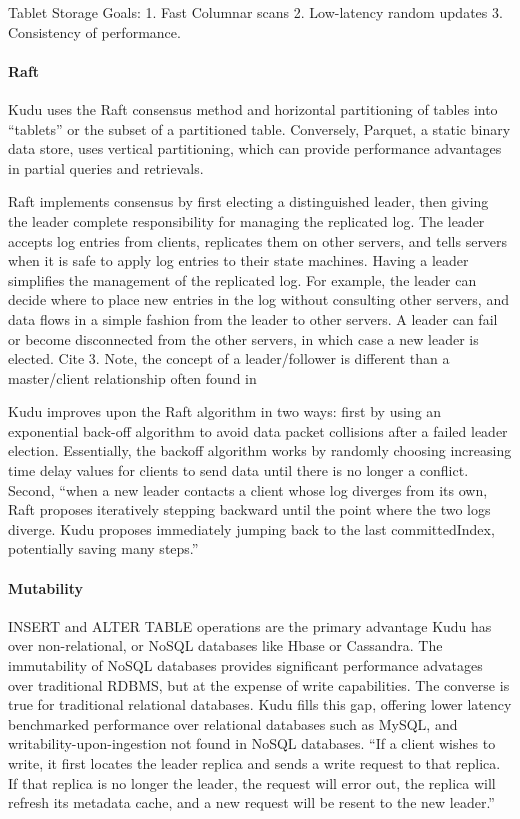 \begin{enumerate}
Tablet Storage Goals: 
1. Fast Columnar scans
2. Low-latency random updates
3. Consistency of performance.
\end{enumerate}

\paragraph{Raft}
Kudu uses the Raft consensus method and horizontal partitioning of
tables into ``tablets'' or the subset of a partitioned table.
Conversely, Parquet, a static binary data store, uses vertical
partitioning, which can provide performance advantages in partial
queries and retrievals. 

Raft implements consensus by first electing a distinguished leader,
then giving the leader complete responsibility for managing the
replicated log. The leader accepts log entries from clients,
replicates them on other servers, and tells servers when it is safe
to apply log entries to their state machines. Having a leader
simplifies the management of the replicated log. For example, the
leader can decide where to place new entries in the log without
consulting other servers, and data flows in a simple fashion from the
leader to other servers. A leader can fail or become disconnected
from the other servers, in which case a new leader is elected.  Cite
3. Note, the concept of a leader/follower is different than a
master/client relationship often found in 

Kudu improves upon the Raft algorithm in two ways: first by using an
exponential back-off algorithm to avoid data packet collisions after
a failed leader election. Essentially, the backoff algorithm works by
randomly choosing increasing time delay values for clients to send
data until there is no longer a conflict. Second, ``when a new leader
contacts a client whose log diverges from its own, Raft proposes
iteratively stepping backward until the point where the two logs
diverge. Kudu proposes immediately jumping back to the last
committedIndex, potentially saving many steps.''
~\cite{hid-sp18-407-kudu-intro}

\paragraph{Mutability} 
INSERT and ALTER TABLE operations are the primary advantage Kudu has
over non-relational, or NoSQL databases like Hbase or Cassandra. The
immutability of NoSQL databases provides significant performance
advatages over traditional RDBMS, but at the expense of write
capabilities. The converse is true for traditional relational
databases.  Kudu fills this gap, offering lower latency benchmarked
performance over relational databases such as MySQL, and
writability-upon-ingestion not found in NoSQL databases. ``If a client wishes to write, it first locates the leader replica
and sends a write request to that replica. If that replica is no
longer the leader, the request will error out, the replica will
refresh its metadata cache, and a new request will be resent to the
new leader.'' ~\cite{hid-sp18-407-kudu-intro}

